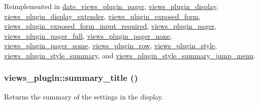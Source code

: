 Reimplemented in \hyperlink{classdate__views__plugin__pager_a59ac4b003dc6526dea57ec530266274b}{date\_\-views\_\-plugin\_\-pager}, \hyperlink{classviews__plugin__display_aefdc473b5cbe1c7eb4d0f5175d02184a}{views\_\-plugin\_\-display}, \hyperlink{classviews__plugin__display__extender_ac8eef76f1f05ac916f9549d5d94164b8}{views\_\-plugin\_\-display\_\-extender}, \hyperlink{classviews__plugin__exposed__form_a6e0fedda54c9532c3827b0b97807ac7e}{views\_\-plugin\_\-exposed\_\-form}, \hyperlink{classviews__plugin__exposed__form__input__required_a452e5c16da60d3b51cdc56335ca3d3e8}{views\_\-plugin\_\-exposed\_\-form\_\-input\_\-required}, \hyperlink{classviews__plugin__pager_a6b9aad7e28125013cbf7a15c19e78d47}{views\_\-plugin\_\-pager}, \hyperlink{classviews__plugin__pager__full_a97cf3d3a2a632da5a5efbea9b344b236}{views\_\-plugin\_\-pager\_\-full}, \hyperlink{classviews__plugin__pager__none_a16102d30cc1402cb7ed28fba9606cf81}{views\_\-plugin\_\-pager\_\-none}, \hyperlink{classviews__plugin__pager__some_a47c807d686e60481be1e6289e3672860}{views\_\-plugin\_\-pager\_\-some}, \hyperlink{classviews__plugin__row_abfc5a6936d485f19d49cfd9eae094f8f}{views\_\-plugin\_\-row}, \hyperlink{classviews__plugin__style_af6b601d8f42cc3d86721fcad76eaae4b}{views\_\-plugin\_\-style}, \hyperlink{classviews__plugin__style__summary_afd8f02a61bd0e1887cc7767950e8e0df}{views\_\-plugin\_\-style\_\-summary}, and \hyperlink{classviews__plugin__style__summary__jump__menu_aee2a45ee02a7ce8d041a5b028758cf0b}{views\_\-plugin\_\-style\_\-summary\_\-jump\_\-menu}.\hypertarget{classviews__plugin_a9a4aaece48a7cf465dd95d59a3bc5ea1}{
\subsubsection[{summary\_\-title}]{\setlength{\rightskip}{0pt plus 5cm}views\_\-plugin::summary\_\-title ()}}
\label{classviews__plugin_a9a4aaece48a7cf465dd95d59a3bc5ea1}
Returns the summary of the settings in the display. 

